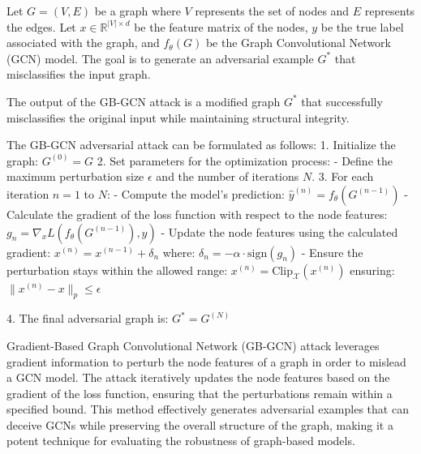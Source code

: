 
Let $G = (V, E)$ be a graph where $V$ represents the set of nodes and $E$ represents the edges. Let $x \in \mathbb{R}^{|V| \times d}$ be the feature matrix of the nodes, $y$ be the true label associated with the graph, and $f_{\theta}(G)$ be the Graph Convolutional Network (GCN) model. The goal is to generate an adversarial example $G^*$ that misclassifies the input graph.

The output of the GB-GCN attack is a modified graph $G^*$ that successfully misclassifies the original input while maintaining structural integrity.

The GB-GCN adversarial attack can be formulated as follows:
1. Initialize the graph:
   $G^{(0)} = G$
2. Set parameters for the optimization process:
   - Define the maximum perturbation size $\epsilon$ and the number of iterations $N$.
3. For each iteration $n = 1$ to $N$:
   - Compute the model's prediction:
   $\hat{y}^{(n)} = f_{\theta}(G^{(n-1)})$
   - Calculate the gradient of the loss function with respect to the node features:
   $g_n = \nabla_x L(f_{\theta}(G^{(n-1)}), y)$
   - Update the node features using the calculated gradient:
   $x^{(n)} = x^{(n-1)} + \delta_n$
   where:
   $\delta_n = -\alpha \cdot \text{sign}(g_n)$
   - Ensure the perturbation stays within the allowed range:
   $x^{(n)} = \text{Clip}_{\mathcal{X}}(x^{(n)})$
   ensuring:
   $\|x^{(n)} - x\|_p \leq \epsilon$

4. The final adversarial graph is:
   $G^* = G^{(N)}$

Gradient-Based Graph Convolutional Network (GB-GCN) attack leverages gradient information to perturb the node features of a graph in order to mislead a GCN model. The attack iteratively updates the node features based on the gradient of the loss function, ensuring that the perturbations remain within a specified bound. This method effectively generates adversarial examples that can deceive GCNs while preserving the overall structure of the graph, making it a potent technique for evaluating the robustness of graph-based models.